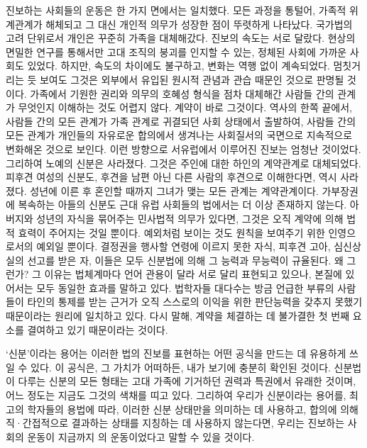 진보하는 사회들의 운동은 한 가지 면에서는 일치했다.
모든 과정을 통털어, 가족적 위계관계가 해체되고 그 대신 개인적 의무가
성장한 점이 뚜렷하게 나타났다.
국가법의 고려 단위로서
개인은 꾸준히 가족을 대체해갔다.
진보의 속도는 서로 달랐다.
현상의 면밀한 연구를 통해서만
고대 조직의 붕괴를 인지할 수 있는,
정체된 사회에 가까운 사회도 있었다.
하지만,
속도의 차이에도 불구하고,
변화는 역행 없이 계속되었다.
멈칫거리는 듯 보여도 그것은 외부에서 유입된 원시적 관념과 관습 때문인 것으로
판명될 것이다.
가족에서 기원한 권리와 의무의 호혜성 형식을 점차 대체해간
사람들 간의 관계가 무엇인지 이해하는 것도 어렵지 않다.
계약이 바로 그것이다.
역사의 한쪽 끝에서,
사람들 간의 모든 관계가 가족 관계로 귀결되던 사회 상태에서 출발하여,
사람들 간의 모든 관계가 개인들의 자유로운 합의에서 생겨나는
사회질서의 국면으로
지속적으로 변화해온 것으로 보인다.
이런 방향으로
서유럽에서
이루어진 진보는 엄청난 것이었다.
그리하여 노예의 신분은 사라졌다.
그것은 주인에 대한 하인의 계약관계로 대체되었다.
피후견 여성의 신분도,
후견을 남편 아닌 다른 사람의 후견으로 이해한다면,
역시 사라졌다.
성년에 이른 후 혼인할 때까지 그녀가 맺는 모든 관계는 계약관계이다.
가부장권에 복속하는 아들의 신분도 근대 유럽 사회들의 법에서는
더 이상 존재하지 않는다.
아버지와 성년의 자식을 묶어주는 민사법적 의무가 있다면,
그것은 오직 계약에 의해 법적 효력이 주어지는 것일 뿐이다.
예외처럼 보이는 것도 원칙을 보여주기 위한
인영으로서의 예외일 뿐이다.
결정권을 행사할 연령에 이르지 못한 자식,
피후견 고아, 심신상실의 선고를 받은 자,
이들은 모두 신분법에 의해
그 능력과 무능력이 규율된다.
왜 그런가?
그 이유는 법체계마다 언어 관용이 달라 서로 달리 표현되고 있으나,
본질에 있어서는 모두 동일한 효과를 말하고 있다.
법학자들 대다수는
방금 언급한 부류의 사람들이
타인의 통제를 받는 근거가
오직
스스로의 이익을 위한 판단능력을 갖추지 못했기 때문이라는 원리에
일치하고 있다.
다시 말해, 계약을 체결하는 데 불가결한
첫 번째 요소를 결여하고 있기 때문이라는 것이다.

`신분'이라는 용어는
이러한 법의 진보를 표현하는 어떤 공식을 만드는 데
유용하게 쓰일 수 있다.
이 공식은, 그 가치가 어떠하든,
내가 보기에 충분히 확인된 것이다.
신분법이 다루는 신분의 모든 형태는
고대 가족에 기거하던 권력과 특권에서 유래한 것이며,
어느 정도는 지금도 그것의 색채를 띠고 있다.
그리하여 우리가 신분이라는 용어를,
최고의 학자들의 용법에 따라,
이러한 신분 상태만을 의미하는 데 사용하고,
합의에 의해 직^^b7간접적으로 결과하는 상태를
지칭하는 데 사용하지 않는다면,
우리는 진보하는 사회의 운동이 지금까지
의 운동이었다고
말할 수 있을 것이다.

